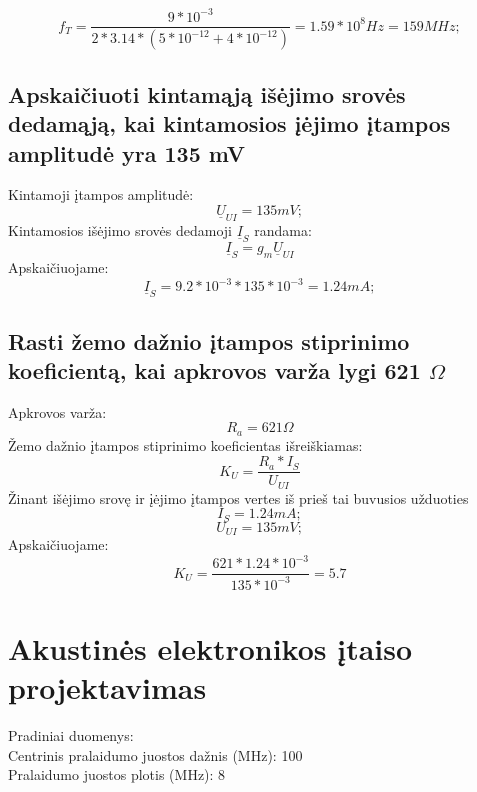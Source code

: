\documentclass[11pt,a4paper]{article}
\begin{document}
\[
f_T = \frac{9*10^{-3}}{2*3.14*(5*10^{-12}+4*10^{-12})} = 1.59 * 10^{8} Hz = 159 MHz;
\]

\subsection{Apskaičiuoti kintamąją išėjimo srovės dedamąją, kai kintamosios įėjimo įtampos amplitudė yra 135 mV}

Kintamoji įtampos amplitudė:
\[
	\underline{U}_{UI} = 135mV;
\]
Kintamosios išėjimo srovės dedamoji $\underline{I}_{S}$ randama:
\begin{equation}
	\underline{I}_{S} = g_m \underline{U}_{UI}
\end{equation}
Apskaičiuojame:
\[
	\underline{I}_{S} = 9.2*10^{-3} * 135*10^{-3} = 1.24 mA;
\]

\subsection{Rasti žemo dažnio įtampos stiprinimo koeficientą, kai apkrovos varža lygi 621 $\Omega$}

Apkrovos varža:
\[
R_a = 621 \Omega
\]
Žemo dažnio įtampos stiprinimo koeficientas išreiškiamas:
\begin{equation}
	K_U = \frac{R_a * I_S}{U_{UI}}
\end{equation}
Žinant išėjimo srovę ir įėjimo įtampos vertes iš prieš tai buvusios užduoties
\[
I_S = 1.24 mA;
\]
\[
U_{UI} = 135 mV;
\]
Apskaičiuojame:
\[
	K_U = \frac{621 * 1.24*10^{-3}}{135 *10^{-3}} = 5.7
\]

\section{Akustinės elektronikos įtaiso projektavimas}
Pradiniai duomenys:\\
Centrinis pralaidumo juostos dažnis (MHz): 100\\
Pralaidumo juostos plotis (MHz): 8
\end{document}
